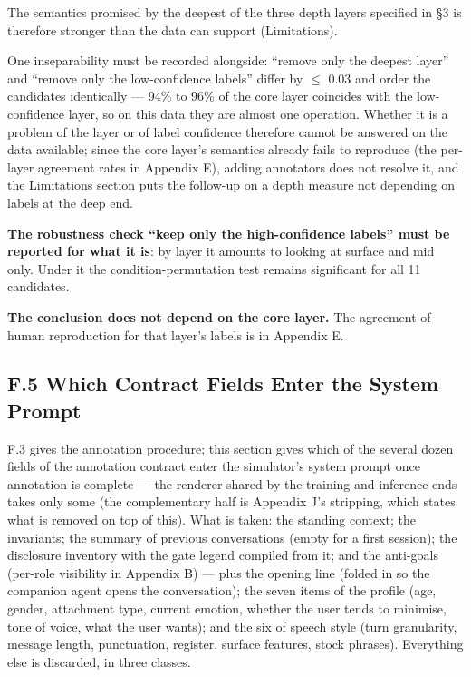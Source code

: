 \documentclass[letterpaper]{article}
\begin{document}
The semantics promised by the deepest of the three depth layers specified in \S{}3 is therefore stronger than the data can support (Limitations).

One inseparability must be recorded alongside: ``remove only the deepest layer'' and ``remove only the low-confidence labels'' differ by $\leq$ 0.03 and order the candidates identically --- 94\% to 96\% of the core layer coincides with the low-confidence layer, so on this data they are almost one operation. Whether it is a problem of the layer or of label confidence therefore cannot be answered on the data available; since the core layer's semantics already fails to reproduce (the per-layer agreement rates in Appendix E), adding annotators does not resolve it, and the Limitations section puts the follow-up on a depth measure not depending on labels at the deep end.

\textbf{The robustness check ``keep only the high-confidence labels'' must be reported for what it is}: by layer it amounts to looking at surface and mid only. Under it the condition-permutation test remains significant for all 11 candidates.

\textbf{The conclusion does not depend on the core layer.} The agreement of human reproduction for that layer's labels is in Appendix E.


\subsection*{F.5 Which Contract Fields Enter the System Prompt}

F.3 gives the annotation procedure; this section gives which of the several dozen fields of the annotation contract enter the simulator's system prompt once annotation is complete --- the renderer shared by the training and inference ends takes only some (the complementary half is Appendix J's stripping, which states what is removed on top of this). What is taken: the standing context; the invariants; the summary of previous conversations (empty for a first session); the disclosure inventory with the gate legend compiled from it; and the anti-goals (per-role visibility in Appendix B) --- plus the opening line (folded in so the companion agent opens the conversation); the seven items of the profile (age, gender, attachment type, current emotion, whether the user tends to minimise, tone of voice, what the user wants); and the six of speech style (turn granularity, message length, punctuation, register, surface features, stock phrases). Everything else is discarded, in three classes.
\end{document}
